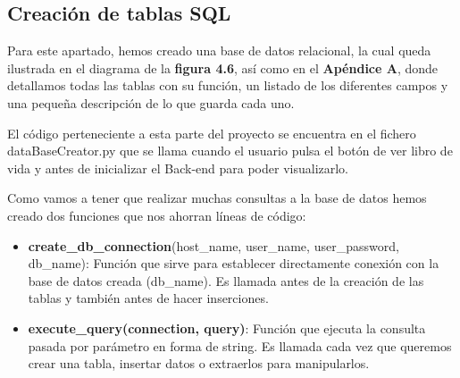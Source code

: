 \subsection{Creación de tablas SQL}

Para este apartado, hemos creado una base de datos relacional, la cual queda ilustrada en el diagrama de la \textbf{figura  4.6}, así como en el \textbf{Apéndice A}, donde detallamos todas las tablas con su función, un listado de los diferentes campos y una pequeña descripción de lo que guarda cada uno.

El código perteneciente a esta parte del proyecto se encuentra en el fichero dataBaseCreator.py que se llama cuando el usuario pulsa el botón de ver libro de vida y antes de inicializar el Back-end para poder visualizarlo.

Como vamos a tener que realizar muchas consultas a la base de datos hemos creado dos funciones que nos ahorran líneas de código:

\begin{itemize}
	\item \textbf{ create\_db\_connection}(host\_name, user\_name, user\_password, db\_name): Función que sirve
	para establecer directamente conexión con la base de datos creada (db\_name). Es llamada antes de la creación de las tablas y también antes de hacer inserciones.
	\item \textbf{ execute\_query(connection, query)}: Función que ejecuta la consulta pasada por parámetro en forma de string. Es llamada cada vez que queremos crear una tabla, insertar datos o extraerlos para manipularlos.
	
\end{itemize}

